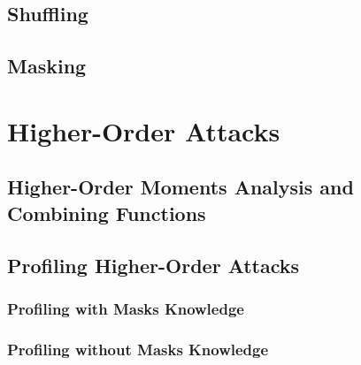 \subsection{Shuffling}
\subsection{Masking}\label{sec:masking}



\section{Higher-Order Attacks}
\subsection{Higher-Order Moments Analysis and Combining Functions}
\subsection{Profiling Higher-Order Attacks}
\subsubsection{Profiling with Masks Knowledge}
\subsubsection{Profiling without Masks Knowledge}

